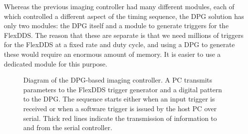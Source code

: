 \documentclass[]{article}
\begin{document}
Whereas the previous imaging controller had many different modules, each of which controlled a different aspect of the timing sequence, the DPG solution has only two modules: the DPG itself and a module to generate triggers for the FlexDDS.  The reason that these are separate is that we need millions of triggers for the FlexDDS at a fixed rate and duty cycle, and using a DPG to generate these would require an enormous amount of memory.  It is easier to use a dedicated module for this purpose.
\begin{figure}[htbp]
	\centering
	\caption{Diagram of the DPG-based imaging controller. A PC transmits parameters to the FlexDDS trigger generator and a digital pattern to the DPG.  The sequence starts either when an input trigger is received or when a software trigger is issued by the host PC over serial.  Thick red lines indicate the transmission of information to and from the serial controller.}
	\label{fg:diagram}
\end{figure}
\end{document}
